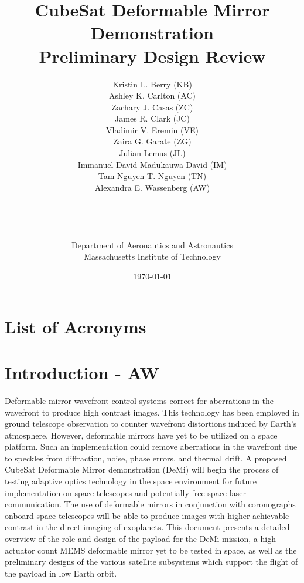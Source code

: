 \documentclass[12pt]{article}
\title{CubeSat Deformable Mirror Demonstration\\Preliminary Design Review\\}
\author{Kristin L. Berry (KB)\\
Ashley K. Carlton (AC)\\
Zachary J. Casas (ZC)\\
James R. Clark (JC)\\
Vladimir V. Eremin (VE)\\ 
Zaira G. Garate (ZG)\\ 
Julian Lemus (JL)\\
Immanuel David Madukauwa-David (IM)\\
Tam Nguyen T. Nguyen (TN)\\
Alexandra E. Wassenberg (AW)\\\\\\\\\\
Department of Aeronautics and Astronautics\\
Massachusetts Institute of Technology\\
}
\date{\today}
\begin{document}
\maketitle
\newpage

\tableofcontents
\listoffigures
\listoftables


\section*{List of Acronyms}
\begin{acronym}


\end{acronym}
\newpage

\section{Introduction - AW}

Deformable mirror wavefront control systems correct for aberrations in the wavefront to produce high contrast images.  This technology has been employed in ground telescope observation to counter wavefront distortions induced by Earth’s atmosphere.  However, deformable mirrors have yet to be utilized on a space platform.  Such an implementation could remove aberrations in the wavefront due to speckles from diffraction, noise, phase errors, and thermal drift.  A proposed CubeSat Deformable Mirror demonstration (DeMi) will begin the process of testing adaptive optics technology in the space environment for future implementation on space telescopes and potentially free-space laser communication.  The use of deformable mirrors in conjunction with coronographs onboard space telescopes will be able to produce images with higher achievable contrast in the direct imaging of exoplanets.  This document presents a detailed overview of the role and design of the payload for the DeMi mission, a high actuator count MEMS deformable mirror yet to be tested in space, as well as the preliminary designs of the various satellite subsystems which support the flight of the payload in low Earth orbit.  
\end{document}
